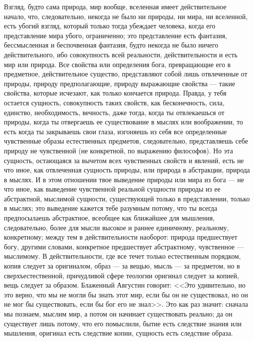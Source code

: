 \documentclass[12pt]{article}
\begin{document}
Взгляд, будто сама природа, мир вообще, вселенная имеет действительное начало, что, следовательно, некогда не было ни природы, ни мира, ни вселенной, есть убогий взгляд, который только тогда убеждает человека, когда его представление мира убого, ограниченно; это представление есть фантазия, бессмысленная и беспочвенная фантазия, будто некогда не было ничего действительного, ибо совокупность всей реальности, действительности и есть мир или природа. Все свойства или определения бога, превращающие его в предметное, действительное существо, представляют собой лишь отвлеченные от природы, природу предполагающие, природу выражающие свойства --- такие свойства, которые исчезают, как только кончается природа. Правда, у тебя остается сущность, совокупность таких свойств, как бесконечность, сила, единство, необходимость, вечность, даже тогда, когда ты отвлекаешься от природы, когда ты отвергаешь ее существование в мыслях или воображении, то есть когда ты закрываешь свои глаза, изгоняешь из себя все определенные чувственные образы естественных предметов, следовательно, представляешь себе природу не чувственной (не конкретной, по выражению философов). Но эта сущность, остающаяся за вычетом всех чувственных свойств и явлений, есть не что иное, как отвлеченная сущность природы, или природа в абстракции, природа в мыслях. И в этом отношении твое выведение природы или мира из бога --- не что иное, как выведение чувственной реальной сущности природы из ее абстрактной, мыслимой сущности, существующей только в представлении, только в мыслях; это выведение кажется тебе разумным потому, что ты всегда предпосылаешь абстрактное, всеобщее как ближайшее для мышления, следовательно, более для мысли высокое и раннее единичному, реальному, конкретному; между тем в действительности наоборот: природа предшествует богу, другими словами, конкретное предшествует абстрактному, чувственное --- мыслимому. В действительности, где все течет только естественным порядком, копия следует за оригиналом, образ --- за вещью, мысль --- за предметом, но в сверхъестественной, причудливой сфере теологии оригинал следует за копией, вещь следует за образом. Блаженный Августин говорит: <<Это удивительно, но это верно, что мы не могли бы знать этот мир, если бы он не существовал, но он не мог бы существовать, если бы бог его не знал>>. Это как раз значит: сначала мы познаем, мыслим мир, а потом он начинает существовать реально; да он существует лишь потому, что его помыслили, бытие есть следствие знания или мышления, оригинал есть следствие копии, сущность есть следствие образа.
\end{document}

